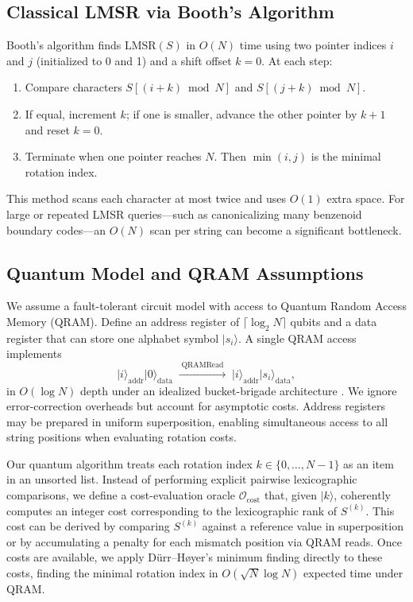 \documentclass[11pt,letterpaper]{article}
\begin{document}
\subsection{Classical LMSR via Booth's Algorithm}
Booth's algorithm finds \(\mathrm{LMSR}(S)\) in \(O(N)\) time using two pointer indices \(i\) and \(j\) (initialized to 0 and 1) and a shift offset \(k=0\). At each step:
\begin{enumerate}
    \item Compare characters \(S[(i+k)\bmod N]\) and \(S[(j+k)\bmod N]\).
    \item If equal, increment \(k\); if one is smaller, advance the other pointer by \(k+1\) and reset \(k=0\).
    \item Terminate when one pointer reaches \(N\). Then \(\min(i,j)\) is the minimal rotation index.
\end{enumerate}
This method scans each character at most twice and uses \(O(1)\) extra space. For large or repeated LMSR queries---such as canonicalizing many benzenoid boundary codes---an \(O(N)\) scan per string can become a significant bottleneck.

\subsection{Quantum Model and QRAM Assumptions}
We assume a fault-tolerant circuit model \cite{nielsen2010quantum} with access to Quantum Random Access Memory (QRAM). Define an address register of \(\lceil \log_2 N\rceil\) qubits and a data register that can store one alphabet symbol \(\lvert s_i\rangle\). A single QRAM access implements
\[
\lvert i\rangle_{\text{addr}} \lvert 0\rangle_{\text{data}}
\;\xrightarrow{\;\mathrm{QRAMRead}\;}\;
\lvert i\rangle_{\text{addr}} \lvert s_i\rangle_{\text{data}},
\]
in \(O(\log N)\) depth under an idealized bucket-brigade architecture \cite{giovannetti2008architectures}. We ignore error-correction overheads but account for asymptotic costs. Address registers may be prepared in uniform superposition, enabling simultaneous access to all string positions when evaluating rotation costs.

Our quantum algorithm treats each rotation index \(k\in\{0,\dots,N-1\}\) as an item in an unsorted list. Instead of performing explicit pairwise lexicographic comparisons, we define a cost-evaluation oracle \(\mathcal{O}_{\text{cost}}\) that, given \(\lvert k\rangle\), coherently computes an integer cost corresponding to the lexicographic rank of \(S^{(k)}\). This cost can be derived by comparing \(S^{(k)}\) against a reference value in superposition or by accumulating a penalty for each mismatch position via QRAM reads. Once costs are available, we apply D{\"u}rr--H{\o}yer's minimum finding \cite{durr1996quantum} directly to these costs, finding the minimal rotation index in \(O(\sqrt{N}\log N)\) expected time under QRAM.
\end{document}
